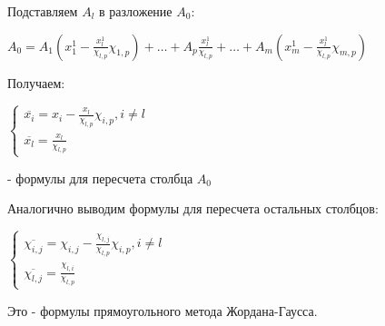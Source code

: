 \documentclass[11pt]{article}
\begin{document}
\begin{sloppypar}
Подставляем $A_l$ в разложение $A_0$:

$A_0 = A_1(x^1_1 - \frac{x^1_l}{\chi_{l, p}} \chi_{1, p}) + \dots + A_p \frac{x^1_l}{\chi_{l, p}} + \dots + A_m(x^1_m - \frac{x^1_l}{\chi_{l, p}} \chi_{m, p})$

Получаем:

$\begin{cases}
  \overline{x_i} = x_i - \frac{x_l}{\chi_{l, p}} \chi_{i, p}, i \neq l \\
  \overline{x_l} = \frac{x_l}{\chi_{l, p}}
\end{cases}$

- формулы для пересчета столбца $A_0$

Аналогично выводим формулы для пересчета остальных столбцов:

$\begin{cases}
  \overline{\chi_{i, j}} = \chi_{i, j} - \frac{\chi_{l, j}}{\chi_{l, p}} \chi_{i, p}, i \neq l \\
  \overline{\chi_{l, j}} = \frac{\chi_{l, i}}{\chi_{l, p}}
\end{cases}$

Это - формулы прямоугольного метода Жордана-Гаусса.

\end{sloppypar}
\end{document}
